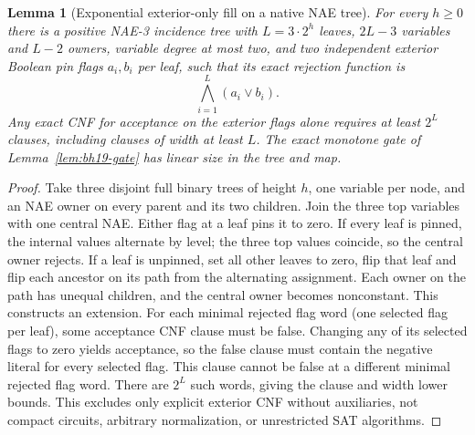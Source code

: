 \documentclass[11pt]{article}
\newtheorem{lemma}[theorem]{Lemma}
\begin{document}
\begin{lemma}[Exponential exterior-only fill on a native NAE tree]\label{lem:bh19-fill}
For every $h\ge0$ there is a positive NAE-3 incidence tree with $L=3\cdot2^h$ leaves, $2L-3$ variables and $L-2$ owners, variable degree at most two, and two independent exterior Boolean pin flags $a_i,b_i$ per leaf, such that its exact rejection function is
\[
\bigwedge_{i=1}^L(a_i\lor b_i).
\]
Any exact CNF for acceptance on the exterior flags alone requires at least $2^L$ clauses, including clauses of width at least $L$. The exact monotone gate of Lemma~\ref{lem:bh19-gate} has linear size in the tree and map.
\end{lemma}
\begin{proof}
Take three disjoint full binary trees of height $h$, one variable per node, and an NAE owner on every parent and its two children. Join the three top variables with one central NAE. Either flag at a leaf pins it to zero. If every leaf is pinned, the internal values alternate by level; the three top values coincide, so the central owner rejects. If a leaf is unpinned, set all other leaves to zero, flip that leaf and flip each ancestor on its path from the alternating assignment. Each owner on the path has unequal children, and the central owner becomes nonconstant. This constructs an extension. For each minimal rejected flag word (one selected flag per leaf), some acceptance CNF clause must be false. Changing any of its selected flags to zero yields acceptance, so the false clause must contain the negative literal for every selected flag. This clause cannot be false at a different minimal rejected flag word. There are $2^L$ such words, giving the clause and width lower bounds. This excludes only explicit exterior CNF without auxiliaries, not compact circuits, arbitrary normalization, or unrestricted SAT algorithms.
\end{proof}
\end{document}
